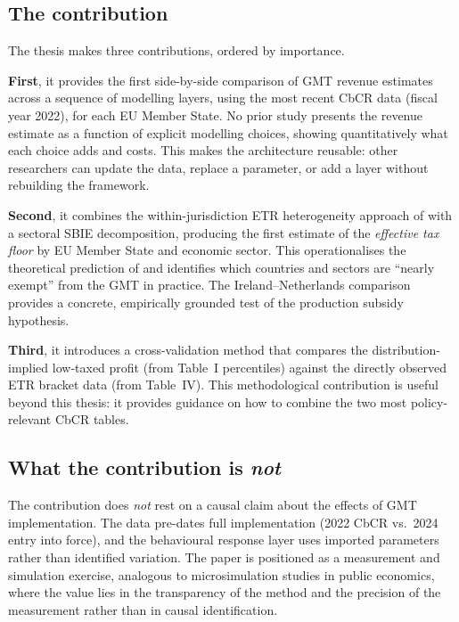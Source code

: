 \documentclass[11pt,a4paper]{article}
\begin{document}
\subsection{The contribution}\label{sec:contribution_statement}

The thesis makes three contributions, ordered by importance.

\textbf{First}, it provides the first side-by-side comparison of GMT revenue estimates across a sequence of modelling layers, using the most recent CbCR data (fiscal year 2022), for each EU Member State. No prior study presents the revenue estimate as a function of explicit modelling choices, showing quantitatively what each choice adds and costs. This makes the architecture reusable: other researchers can update the data, replace a parameter, or add a layer without rebuilding the framework.

\textbf{Second}, it combines the within-jurisdiction ETR heterogeneity approach of \citet{hugger2025} with a sectoral SBIE decomposition, producing the first estimate of the \emph{effective tax floor} by EU Member State and economic sector. This operationalises the theoretical prediction of \citet{schjelderup2024} and identifies which countries and sectors are ``nearly exempt'' from the GMT in practice. The Ireland--Netherlands comparison provides a concrete, empirically grounded test of the production subsidy hypothesis.

\textbf{Third}, it introduces a cross-validation method that compares the distribution-implied low-taxed profit (from Table~I percentiles) against the directly observed ETR bracket data (from Table~IV). This methodological contribution is useful beyond this thesis: it provides guidance on how to combine the two most policy-relevant CbCR tables.

\subsection{What the contribution is \emph{not}}\label{sec:not}

The contribution does \emph{not} rest on a causal claim about the effects of GMT implementation. The data pre-dates full implementation (2022 CbCR vs.\ 2024 entry into force), and the behavioural response layer uses imported parameters rather than identified variation. The paper is positioned as a measurement and simulation exercise, analogous to microsimulation studies in public economics, where the value lies in the transparency of the method and the precision of the measurement rather than in causal identification.
\end{document}
